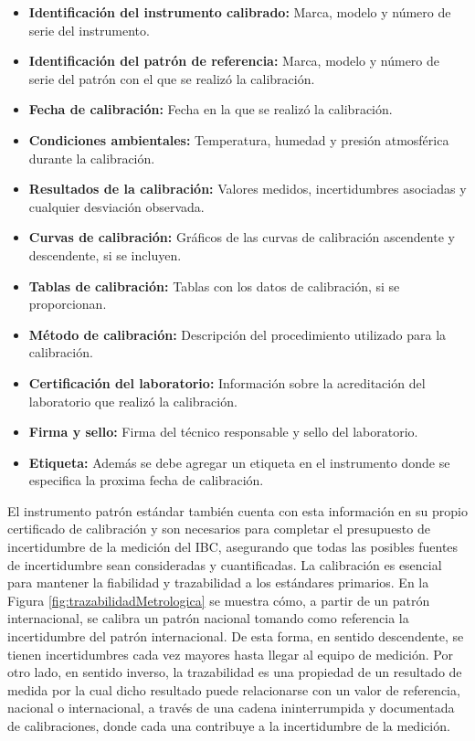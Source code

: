 \begin{itemize}
    \item \textbf{Identificación del instrumento calibrado:} Marca, modelo y número de serie del instrumento.
    \item \textbf{Identificación del patrón de referencia:} Marca, modelo y número de serie del patrón con el que se realizó la calibración.
    \item \textbf{Fecha de calibración:} Fecha en la que se realizó la calibración.
    \item \textbf{Condiciones ambientales:} Temperatura, humedad y presión atmosférica durante la calibración.
    \item \textbf{Resultados de la calibración:} Valores medidos, incertidumbres asociadas y cualquier desviación observada.
    \item \textbf{Curvas de calibración:} Gráficos de las curvas de calibración ascendente y descendente, si se incluyen.
    \item \textbf{Tablas de calibración:} Tablas con los datos de calibración, si se proporcionan.
    \item \textbf{Método de calibración:} Descripción del procedimiento utilizado para la calibración.
    \item \textbf{Certificación del laboratorio:} Información sobre la acreditación del laboratorio que realizó la calibración.
    \item \textbf{Firma y sello:} Firma del técnico responsable y sello del laboratorio.
    \item \textbf{Etiqueta:} Además se debe agregar un etiqueta en el instrumento donde se especifica la proxima fecha de calibración.
\end{itemize}

El instrumento patrón estándar también cuenta con esta información en su propio certificado de calibración y son necesarios para completar el presupuesto de incertidumbre de la medición del IBC, asegurando que todas las posibles fuentes de incertidumbre sean consideradas y cuantificadas. La calibración es esencial para mantener la fiabilidad y trazabilidad a los estándares primarios. En la Figura \ref{fig:trazabilidadMetrologica} se muestra cómo, a partir de un patrón internacional, se calibra un patrón nacional tomando como referencia la incertidumbre del patrón internacional. De esta forma, en sentido descendente, se tienen incertidumbres cada vez mayores hasta llegar al equipo de medición. Por otro lado, en sentido inverso, la trazabilidad es una propiedad de un resultado de medida por la cual dicho resultado puede relacionarse con un valor de referencia, nacional o internacional, a través de una cadena ininterrumpida y documentada de calibraciones, donde cada una contribuye a la incertidumbre de la medición.


